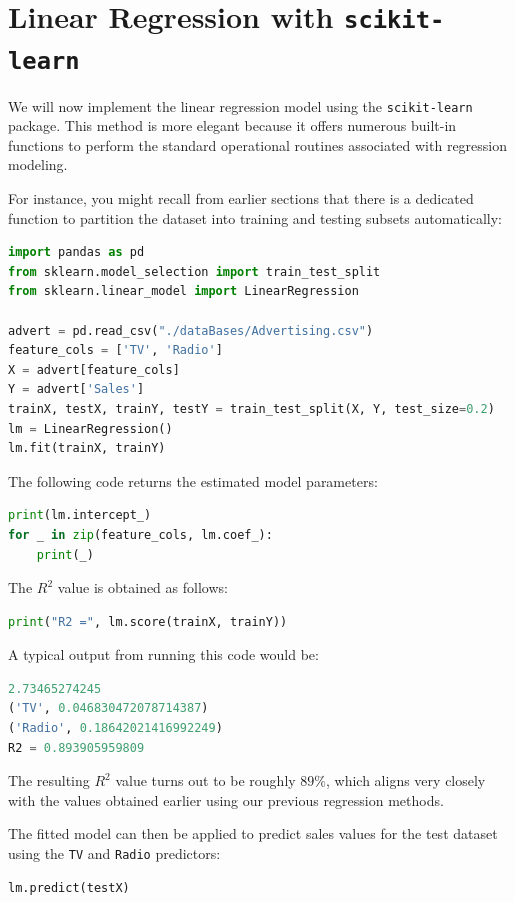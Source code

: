 \section{Linear Regression with \texttt{scikit-learn}}

We will now implement the linear regression model using the \texttt{scikit-learn} package. This method is more elegant because it offers numerous built-in functions to perform the standard operational routines associated with regression modeling.

For instance, you might recall from earlier sections that there is a dedicated function to partition the dataset into training and testing subsets automatically:

\begin{lstlisting}[language=Python]
import pandas as pd
from sklearn.model_selection import train_test_split
from sklearn.linear_model import LinearRegression

advert = pd.read_csv("./dataBases/Advertising.csv")
feature_cols = ['TV', 'Radio']
X = advert[feature_cols]
Y = advert['Sales']
trainX, testX, trainY, testY = train_test_split(X, Y, test_size=0.2)
lm = LinearRegression()
lm.fit(trainX, trainY)
\end{lstlisting}

The following code returns the estimated model parameters:
\begin{lstlisting}[language=Python]
print(lm.intercept_)
for _ in zip(feature_cols, lm.coef_):
    print(_)
\end{lstlisting}

The $R^{2}$ value is obtained as follows:
\begin{lstlisting}[language=Python]
print("R2 =", lm.score(trainX, trainY))
\end{lstlisting}

A typical output from running this code would be:
\begin{lstlisting}[language=Python]
2.73465274245
('TV', 0.046830472078714387)
('Radio', 0.18642021416992249)
R2 = 0.893905959809
\end{lstlisting}

The resulting $R^{2}$ value turns out to be roughly $89\%$, which aligns very closely with the values obtained earlier using our previous regression methods.

The fitted model can then be applied to predict sales values for the test dataset using the \texttt{TV} and \texttt{Radio} predictors:
\begin{lstlisting}[language=Python]
lm.predict(testX)
\end{lstlisting}

